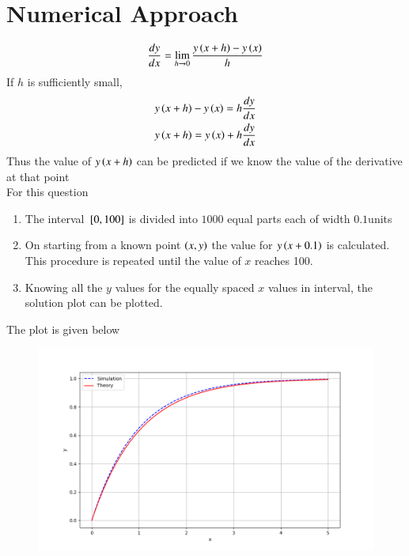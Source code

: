 \documentclass[journal,12pt,onecolumn]{IEEEtran}
\theoremstyle{remark}
\begin{document}
\section{Numerical Approach}
\begin{align*}
\frac{dy}{dx}=\lim_{h \rightarrow 0} \frac{y\left(x+h\right)-y\left(x\right)}{h}
\end{align*}
If $h$ is sufficiently small,\\
\begin{align*}
    y\left(x+h\right)-y\left(x\right)=h\frac{dy}{dx}\\
    y\left(x+h\right)=y\left(x\right)+h\frac{dy}{dx}
\end{align*}
Thus the value of $y\left(x+h\right)$ can be predicted if we know the value of the derivative at that point\\
For this question 
\begin{enumerate}
    \item The interval ${}\left[0,100\right]$ is divided  into $1000$ equal parts each of width $0.1$units
    \item On starting from a known point $\left(x,y\right)$ the value for $y\left(x+0.1\right)$ is calculated. This procedure is repeated until the value of $x$ reaches 100.
    \item Knowing all the $y$ values for the equally spaced $x$ values in interval, the solution plot can be plotted.
\end{enumerate}
\newpage
The plot is given below\\
\begin{figure}[h!]
    \centering
    \includegraphics[width=0.7\columnwidth]{figs/Q1.png}
    \label{stemplot}
\end{figure}
\end{document}

